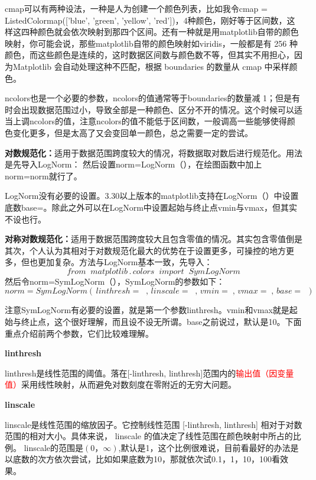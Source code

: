 \documentclass[12pt]{article}
\begin{document}
cmap可以有两种设法，一种是人为创建一个颜色列表，比如我令cmap = ListedColormap(['blue', 'green', 'yellow', 'red'])，4种颜色，刚好等于区间数，这样这四种颜色就会依次映射到那四个区间。还有一种就是用matplotlib自带的颜色映射，你可能会说，那些matplotlib自带的颜色映射如viridis，一般都是有 256 种颜色，而这些颜色是连续的，这时数据区间数与颜色数不等，但其实不用担心，因为Matplotlib 会自动处理这种不匹配，根据   boundaries   的数量从   cmap   中采样颜色。

 ncolors也是一个必要的参数，ncolors的值通常等于boundaries的数量减 1；但是有时会出现数据范围过小，导致全部是一种颜色、区分不开的情况。这个时候可以适当上调ncolors的值，注意ncolors的值不能低于区间数，一般调高一些能够使得颜色变化更多，但是太高了又会变回单一颜色，总之需要一定的尝试。





\noindent\textbf{对数规范化：}适用于数据范围跨度较大的情况，将数据取对数后进行规范化。用法是先导入LogNorm：
然后设置norm=LogNorm（），在绘图函数中加上norm=norm就行了。

LogNorm没有必要的设置。3.30以上版本的matplotlib支持在LogNorm（）中设置底数base=。除此之外可以在LogNorm中设置起始与终止点vmin与vmax，但其实不设也行。

\noindent\textbf{对称对数规范化：}适用于数据范围跨度较大且包含零值的情况。其实包含零值倒是其次，个人认为其相对于对数规范化最大的优势在于设置更多，可操控的地方更多，但也更加复杂。方法与LogNorm基本一致，先导入：
\[from\;\; matplotlib\,.\,colors\;\; import\;\; SymLogNorm\]
然后令norm=SymLogNorm（），SymLogNorm的参数如下：
\[norm = SymLogNorm(\,linthresh=\;\;,\, linscale=\;\;,\, vmin=\;,\, vmax=\;,\, base=\;\,)\]

注意SymLogNorm有必要的设置，就是第一个参数linthresh。vmin和vmax就是起始与终止点，这个很好理解，而且设不设无所谓。base之前说过，默认是10。下面重点介绍前两个参数，它们比较难理解。

\noindent\textbf{linthresh} 

linthresh是线性范围的阈值。落在[-linthresh, linthresh]范围内的\textcolor{red}{输出值（因变量值）}采用线性映射，从而避免对数刻度在零附近的无穷大问题。

\noindent\textbf{linscale}

linscale是线性范围的缩放因子。它控制线性范围   [-linthresh, linthresh]   相对于对数范围的相对大小。具体来说，  linscale   的值决定了线性范围在颜色映射中所占的比例。
linscale的范围是\((0，\infty)\),默认是1，这个比例很难说，目前看最好的办法是以底数的次方依次尝试，比如如果底数为10，那就依次试0.1，1，10，100看效果。
\end{document}
